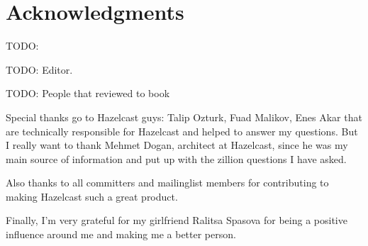 \chapter*{Acknowledgments}

TODO: 

TODO: Editor.

TODO: People that reviewed to book

Special thanks go to Hazelcast guys: Talip Ozturk, Fuad Malikov, Enes Akar that are technically responsible for Hazelcast and helped to answer my questions. But I really want to thank Mehmet Dogan, architect at Hazelcast, since he was my main source of information and put up with the zillion questions I have asked.

Also thanks to all committers and mailinglist members for contributing to making Hazelcast such a great product.

Finally, I'm very grateful for my girlfriend Ralitsa Spasova for being a positive influence around me and making me a better person.

